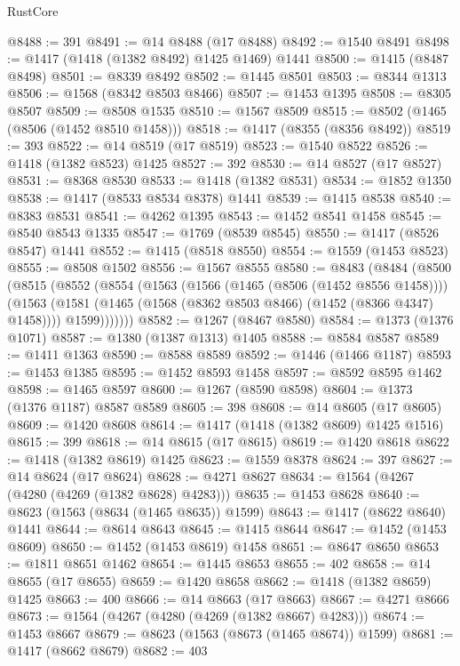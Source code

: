 \begin{lexlean}{RustCore}
\begin{coremodule}
@8488 := 391
@8491 := @14 @8488 (@17 @8488)
@8492 := @1540 @8491
@8498 := @1417 (@1418 (@1382 @8492) @1425 @1469) @1441
@8500 := @1415 (@8487 @8498)
@8501 := @8339 @8492
@8502 := @1445 @8501
@8503 := @8344 @1313
@8506 := @1568 (@8342 @8503 @8466)
@8507 := @1453 @1395
@8508 := @8305 @8507
@8509 := @8508 @1535
@8510 := @1567 @8509
@8515 := @8502 (@1465 (@8506 (@1452 @8510 @1458)))
@8518 := @1417 (@8355 (@8356 @8492))
@8519 := 393
@8522 := @14 @8519 (@17 @8519)
@8523 := @1540 @8522
@8526 := @1418 (@1382 @8523) @1425
@8527 := 392
@8530 := @14 @8527 (@17 @8527)
@8531 := @8368 @8530
@8533 := @1418 (@1382 @8531)
@8534 := @1852 @1350
@8538 := @1417 (@8533 @8534 @8378) @1441
@8539 := @1415 @8538
@8540 := @8383 @8531
@8541 := @4262 @1395
@8543 := @1452 @8541 @1458
@8545 := @8540 @8543 @1335
@8547 := @1769 (@8539 @8545)
@8550 := @1417 (@8526 @8547) @1441
@8552 := @1415 (@8518 @8550)
@8554 := @1559 (@1453 @8523)
@8555 := @8508 @1502
@8556 := @1567 @8555
@8580 := @8483
    (@8484
      (@8500
        (@8515
          (@8552
            (@8554
              (@1563
                (@1566 (@1465 (@8506 (@1452 @8556 @1458))))
                (@1563
                  (@1581 (@1465 (@1568 (@8362 @8503 @8466) (@1452 (@8366 @4347) @1458))))
                  @1599)))))))
@8582 := @1267 (@8467 @8580)
@8584 := @1373 (@1376 @1071)
@8587 := @1380 (@1387 @1313) @1405
@8588 := @8584 @8587
@8589 := @1411 @1363
@8590 := @8588 @8589
@8592 := @1446 (@1466 @1187)
@8593 := @1453 @1385
@8595 := @1452 @8593 @1458
@8597 := @8592 @8595 @1462
@8598 := @1465 @8597
@8600 := @1267 (@8590 @8598)
@8604 := @1373 (@1376 @1187) @8587 @8589
@8605 := 398
@8608 := @14 @8605 (@17 @8605)
@8609 := @1420 @8608
@8614 := @1417 (@1418 (@1382 @8609) @1425 @1516)
@8615 := 399
@8618 := @14 @8615 (@17 @8615)
@8619 := @1420 @8618
@8622 := @1418 (@1382 @8619) @1425
@8623 := @1559 @8378
@8624 := 397
@8627 := @14 @8624 (@17 @8624)
@8628 := @4271 @8627
@8634 := @1564 (@4267 (@4280 (@4269 (@1382 @8628) @4283)))
@8635 := @1453 @8628
@8640 := @8623 (@1563 (@8634 (@1465 @8635)) @1599)
@8643 := @1417 (@8622 @8640) @1441
@8644 := @8614 @8643
@8645 := @1415 @8644
@8647 := @1452 (@1453 @8609)
@8650 := @1452 (@1453 @8619) @1458
@8651 := @8647 @8650
@8653 := @1811 @8651 @1462
@8654 := @1445 @8653
@8655 := 402
@8658 := @14 @8655 (@17 @8655)
@8659 := @1420 @8658
@8662 := @1418 (@1382 @8659) @1425
@8663 := 400
@8666 := @14 @8663 (@17 @8663)
@8667 := @4271 @8666
@8673 := @1564 (@4267 (@4280 (@4269 (@1382 @8667) @4283)))
@8674 := @1453 @8667
@8679 := @8623 (@1563 (@8673 (@1465 @8674)) @1599)
@8681 := @1417 (@8662 @8679)
@8682 := 403

\end{coremodule}
\end{lexlean}
